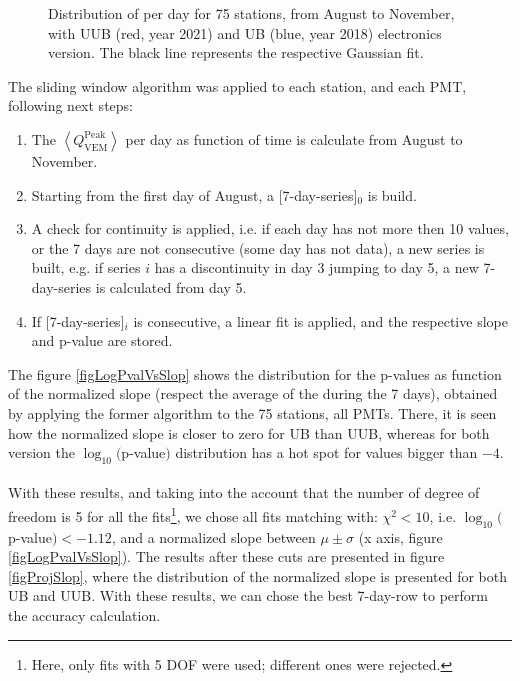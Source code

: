 \documentclass[twoside, final, 10pt]{articleMine}
\begin{document}
\begin{figure}[!t]
  \label{figDistQpkPerDay}
  \centering
  \caption{Distribution of \qpkvem per day for 75 stations, from
  August to November, with UUB (red, year 2021) and UB (blue,
  year 2018) electronics version. The black line represents the
  respective Gaussian fit.}
  \label{figDistQpkPerDay}
\end{figure}

\noindent The sliding window algorithm was applied to each
station, and each PMT, following next steps:
\begin{enumerate}
  \item The $\left< Q^{\mathrm{Peak}}_{\mathrm{VEM}}\right>$ per
    day as function of time is calculate from August to November.
  \item Starting from the first day of August, a
    [7-day-series]$_0$ is build.
  \item A check for continuity is applied, i.e. if each day has
    not more then 10 \qpkvem values, or the 7 days are not
    consecutive (some day has not data), a new series is built,
    e.g. if series $i$ has a discontinuity in day 3 jumping to
    day 5, a new 7-day-series is calculated from day 5.
  \item If [7-day-series]$_i$ is consecutive, a linear fit is
    applied, and the respective slope and p-value are stored.
\end{enumerate}

\noindent The figure \ref{figLogPvalVsSlop} shows the
distribution for the p-values as function of the normalized slope
(respect the average of the \qpkvem during the 7 days), obtained
by applying the former algorithm to the 75 stations, all PMTs.
There, it is seen how the normalized slope is closer to zero for
UB than UUB, whereas for both version the $\log_{10}($p-value$)$
distribution has a hot spot for values bigger than $-4$.\\\\With
these results, and taking into the account that the number of
degree of freedom is 5 for all the fits\footnote{Here, only fits
with 5 DOF were used; different ones were rejected.}, we chose
all fits matching with: $\chi^2<10$, i.e.
$\log_{10}($p-value$)<-1.12$, and a normalized slope between
$\mu\pm\sigma$ (x axis, figure \ref{figLogPvalVsSlop}). The
results after these cuts are presented in figure
\ref{figProjSlop}, where the distribution of the normalized slope
is presented for both UB and UUB. With these results, we can
chose the best 7-day-row to perform the accuracy calculation.
\clearpage
\end{document}
